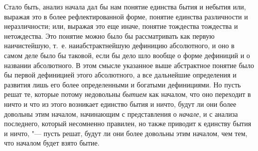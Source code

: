 Стало быть, анализ начала дал бы нам понятие единства бытия и небытия или,
выражая это в более рефлектированной форме, понятие единства различности и
неразличности; или, выражая это еще иначе, понятие тождества тождества и
нетождества.
Это понятие можно было бы рассматривать как первую наичистейшую, т.~е.
наиабстрактнейшую дефиницию абсолютного, и оно в самом деле было бы
таковой, если бы дело шло вообще о форме дефиниций и о названии
абсолютного. В этом смысле указанное выше абстрактное понятие было бы
первой дефиницией этого абсолютного, а все дальнейшие определения и
развития лишь его более определенными и богатыми дефинициями. Но пусть
решат те, которые потому недовольны {\em бытием} как
началом, что оно переходит в ничто и что из этого возникает единство бытия
и ничто, будут ли они более довольны этим началом, начинающим с
представления о {\em начале}, и с анализа последнего,
который несомненно правилен, но также приводит к единству бытия и ничто, "---
пусть решат, будут ли они более довольны этим началом, чем тем, что началом
будет взято бытие.

